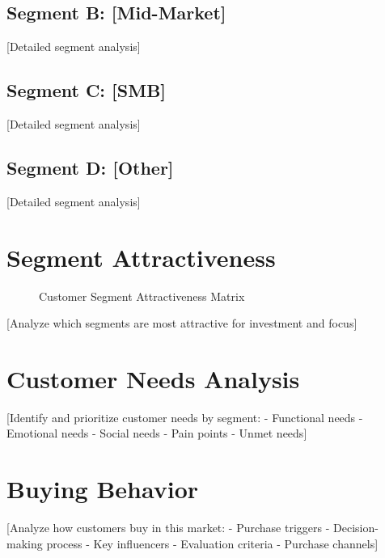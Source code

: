 \documentclass[11pt,letterpaper]{report}
\begin{document}
\subsection{Segment B: [Mid-Market]}
[Detailed segment analysis]

\subsection{Segment C: [SMB]}
[Detailed segment analysis]

\subsection{Segment D: [Other]}
[Detailed segment analysis]

\section{Segment Attractiveness}


\begin{figure}[htbp]
\centering
\caption{Customer Segment Attractiveness Matrix}
\label{fig:segment_attractiveness}
\end{figure}

[Analyze which segments are most attractive for investment and focus]

\section{Customer Needs Analysis}

[Identify and prioritize customer needs by segment:
- Functional needs
- Emotional needs
- Social needs
- Pain points
- Unmet needs]

\section{Buying Behavior}

[Analyze how customers buy in this market:
- Purchase triggers
- Decision-making process
- Key influencers
- Evaluation criteria
- Purchase channels]
\end{document}
